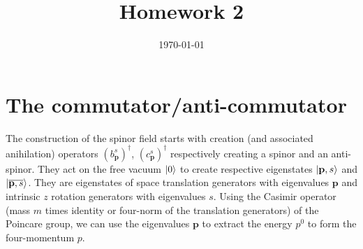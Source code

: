 \documentclass[10pt, a4paper]{article}
\title{Homework 2} %
\author{\PA} %
\date{\today} %
\begin{document}
\maketitlepage

\maketableofcontents


\section{The commutator/anti-commutator}
The construction of the spinor field starts with creation (and associated anihilation) operators $(b_\mathbf{p}^s)^\dagger$, $(c_\mathbf{p}^s)^\dagger$ respectively creating a spinor and an anti-spinor. They act on the free vacuum $\ket{0}$ to create respective eigenstates $\ket{\mathbf{p}, s}$ and $\ket{\overline{\mathbf{p}, s}}$. They are eigenstates of space translation generators with eigenvalues $\mathbf{p}$ and intrinsic $z$ rotation generators with eigenvalues $s$. Using the Casimir operator (mass $m$ times identity or four-norm of the translation generators) of the Poincare group, we can use the eigenvalues $\mathbf{p}$ to extract the energy $p^0$ to form the four-momentum $p$. 
\end{document}
